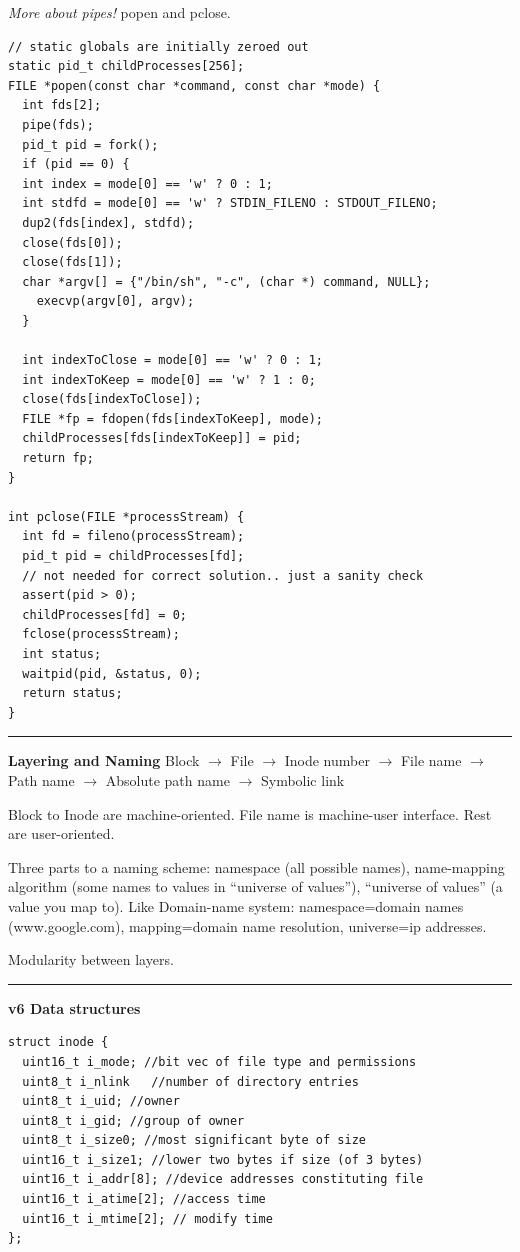 \documentclass{article}
\begin{document}
\begin{multicols}{2}
{\it More about pipes!} popen and pclose.
\begin{verbatim}
// static globals are initially zeroed out
static pid_t childProcesses[256];
FILE *popen(const char *command, const char *mode) {
  int fds[2];
  pipe(fds);
  pid_t pid = fork();
  if (pid == 0) {
  int index = mode[0] == 'w' ? 0 : 1;
  int stdfd = mode[0] == 'w' ? STDIN_FILENO : STDOUT_FILENO;
  dup2(fds[index], stdfd);
  close(fds[0]);
  close(fds[1]);
  char *argv[] = {"/bin/sh", "-c", (char *) command, NULL};
    execvp(argv[0], argv);
  }

  int indexToClose = mode[0] == 'w' ? 0 : 1;
  int indexToKeep = mode[0] == 'w' ? 1 : 0;
  close(fds[indexToClose]);
  FILE *fp = fdopen(fds[indexToKeep], mode);
  childProcesses[fds[indexToKeep]] = pid;
  return fp;
}

int pclose(FILE *processStream) {
  int fd = fileno(processStream);
  pid_t pid = childProcesses[fd];
  // not needed for correct solution.. just a sanity check
  assert(pid > 0);
  childProcesses[fd] = 0;
  fclose(processStream);
  int status;
  waitpid(pid, &status, 0);
  return status;
}
\end{verbatim}

  \noindent\rule{4cm}{0.4pt}

  {\bf Layering and Naming}
  Block $\rightarrow$ File $\rightarrow$ Inode number $\rightarrow$ File name
  $\rightarrow$ Path name $\rightarrow$ Absolute path name $\rightarrow$
  Symbolic link

  Block to Inode are machine-oriented. File name is machine-user interface. Rest
  are user-oriented.

  Three parts to a naming scheme: namespace (all possible names), name-mapping
  algorithm (some names to values in ``universe of values''), ``universe of
  values'' (a value you map to). Like Domain-name system: namespace=domain names
  (www.google.com), mapping=domain name resolution, universe=ip addresses.

  Modularity between layers. %

  \noindent\rule{4cm}{0.4pt}

  {\bf v6 Data structures}
  \begin{verbatim}
struct inode {
  uint16_t i_mode; //bit vec of file type and permissions
  uint8_t i_nlink	//number of directory entries
  uint8_t i_uid; //owner
  uint8_t i_gid; //group of owner
  uint8_t i_size0; //most significant byte of size
  uint16_t i_size1; //lower two bytes if size (of 3 bytes)
  uint16_t i_addr[8]; //device addresses constituting file
  uint16_t i_atime[2]; //access time
  uint16_t i_mtime[2]; // modify time
};


\end{verbatim}
\end{multicols}
\end{document}
